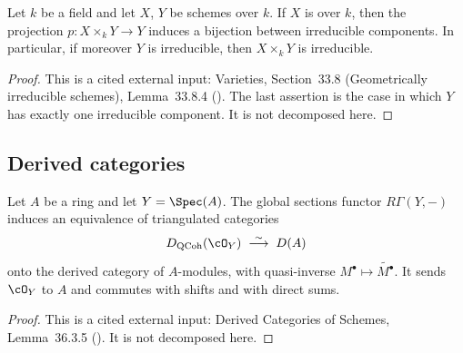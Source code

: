 \begin{lemma}
\label{lem:pc-geom-irreducible-product}
Let $k$ be a field and let $X$, $Y$ be schemes over $k$.  If $X$ is
 over $k$, then the
projection $p:X\times_kY\to Y$ induces a bijection between irreducible components.  In
particular, if moreover $Y$ is irreducible, then $X\times_kY$ is irreducible.
\end{lemma}
\begin{proof}
This is a cited external input: Varieties, Section~33.8 (Geometrically irreducible schemes),
Lemma~33.8.4 ().  The last assertion is the case in which $Y$ has exactly
one irreducible component.  It is not decomposed here.
\end{proof}


\subsection{Derived categories}

\begin{lemma}
\label{lem:pc-affine-derived-equivalence}
Let $A$ be a ring and let $Y=\Spec(A)$.  The global sections functor
$R\Gamma(Y,-)$ induces an equivalence of triangulated categories
\[
D_{\text{QCoh}}(\cO_Y)\;\stackrel{\sim}{\longrightarrow}\;D(A)
\]
onto the derived category of $A$-modules, with quasi-inverse
$M^\bullet\mapsto\widetilde{M^\bullet}$.  It sends $\cO_Y$ to $A$ and
commutes with shifts and with direct sums.
\end{lemma}
\begin{proof}
This is a cited external input: Derived Categories of Schemes,
Lemma~36.3.5 ().  It is not decomposed here.
\end{proof}

